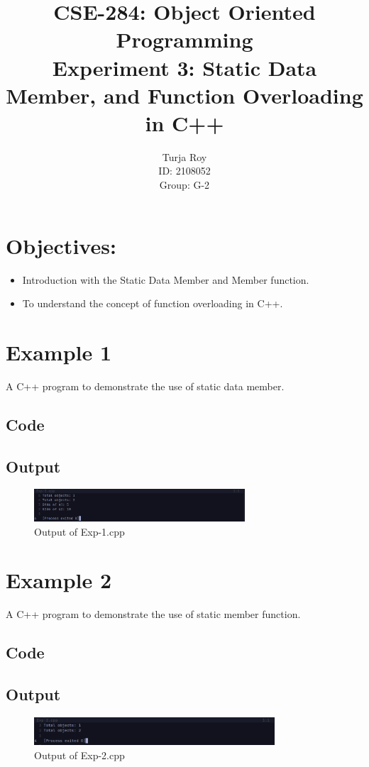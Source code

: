 \documentclass[12pt]{article}
\title{
    CSE-284: Object Oriented Programming \\
    Experiment 3: Static Data Member, and Function Overloading in C++
}
\author{
    Turja Roy \\ 
    ID: 2108052 \\ 
    Group: G-2
}
\date{}
\begin{document}
\maketitle

\section*{Objectives:}
\begin{itemize}
    \item Introduction with the Static Data Member and Member function.
    \item To understand the concept of function overloading in C++.
\end{itemize}


\FloatBarrier
\section*{Example 1}
A C++ program to demonstrate the use of static data member.

\subsection*{Code}


\subsection*{Output}
\vspace{-1em}
\begin{figure}[htpb]
    \centering
    \includegraphics[width=0.7\textwidth]{Exp-1.png}
    \caption{Output of Exp-1.cpp}
\end{figure}


\FloatBarrier
\section*{Example 2}
A C++ program to demonstrate the use of static member function.

\subsection*{Code}


\subsection*{Output}
\begin{figure}[htpb]
    \centering
    \includegraphics[width=0.8\textwidth]{Exp-2.png}
    \caption{Output of Exp-2.cpp}
\end{figure}
\end{document}
